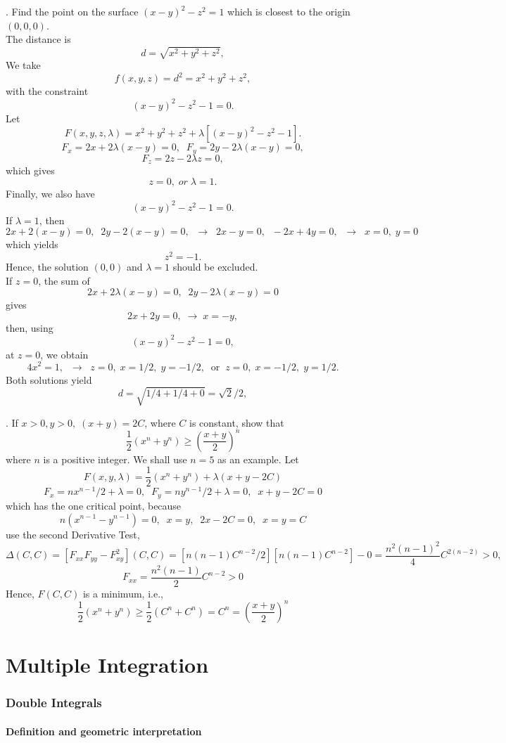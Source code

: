 \documentclass{article}
\begin{document}
. Find the point on the surface
$(x-y)^2-z^2=1$ which is closest to the origin $(0,0,0)$.\\
The distance is
$$
d=\sqrt{x^2+y^2+z^2},
$$
We take
$$
f(x,y,z)=d^2= x^2+y^2+z^2,
$$
with the constraint
$$
(x-y)^2-z^2-1=0.
$$
Let
$$
F(x,y,z, \lambda)= x^2+y^2+z^2 + \lambda \left[ (x-y)^2-z^2-1
\right].
$$
$$
F_x=2x+ 2\lambda(x-y)=0, \;\;  F_y=2y- 2\lambda(x-y)=0,
$$
$$
F_z=2z- 2\lambda z =0,
$$
which gives
$$
z=0, \; or  \; \lambda=1.
$$
Finally, we also have 
$$
(x-y)^2-z^2-1=0.
$$
If $\lambda=1$, then
$$
2x+ 2(x-y)=0, \;\;  2y- 2(x-y)=0, \;\; \to \;\;  2x-y=0, \;\;
-2x+4y=0, \;\; \to \;\; x=0, \; y=0
$$
which yields 
$$
z^2=-1.
$$
Hence, the solution $(0,0)$ and $\lambda=1$ should be excluded. \\

If $z=0$, the sum of 
$$
2x+ 2\lambda(x-y)=0, \;\;  2y- 2\lambda(x-y)=0
$$
gives
$$
2x+ 2y=0, \; \to \;    x=-y,
$$
then, using
$$
(x-y)^2-z^2-1=0,
$$
at $z=0$,
we obtain 
$$
4 x^2=1, \;\; \to \;\; z=0,\;
x=1/2, \; y=-1/2, \;\; \mbox{or} \;\; z=0, \;  x=-1/2, \; y=1/2.
$$
Both solutions yield
$$
d=\sqrt{1/4+1/4+0}=\sqrt{2}/2,
$$

\bigskip

. If $x>0, y>0, \;(x+y)=2C$, where $C$ is
constant, show that
$$
\frac{1}{2}(x^n+y^n) \ge \left( \frac{x+y}{2} \right)^n
$$
where $n$ is a positive integer. We shall use $n=5$ as an example.
Let
$$
F(x,y,\lambda)=\frac{1}{2}(x^n+y^n) +\lambda (x+y-2C)
$$
$$
F_x=nx^{n-1}/2+ \lambda=0, \;\; F_y=ny^{n-1}/2+ \lambda=0, \;\;
x+y-2C=0
$$
which has the one critical point, because
$$
n(x^{n-1}-y^{n-1})=0, \;\; x=y, \;\; 2x-2C=0, \;\; x=y=C
$$
use the second Derivative Test,
$$
\Delta(C,C) =\left[ F_{xx} F_{yy}- F_{xy}^2 \right](C,C)=\left[
n(n-1)C^{n-2}/2 \right] \left[ n(n-1)C^{n-2} \right]
-0=\frac{n^2(n-1)^2}{4} C^{2(n-2)}>0,
$$
$$
F_{xx}= \frac{n^2(n-1)}{2} C^{n-2}>0
$$
Hence, $F(C,C)$ is a minimum, i.e.,
$$
\frac{1}{2}(x^n+y^n) \ge \frac{1}{2}(C^n+C^n)=C^n= \left(
\frac{x+y}{2} \right)^n
$$

\part{Multiple Integration}

\section{Double Integrals}
\subsection{Definition and geometric interpretation}
\end{document}
